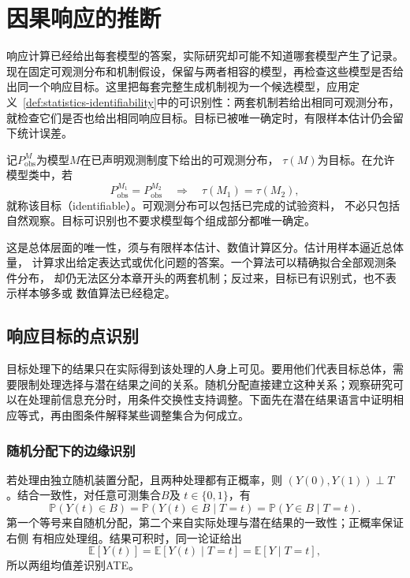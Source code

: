 \section{因果响应的推断}
\label{sec:causal-effect-identification}

响应计算已经给出每套模型的答案，实际研究却可能不知道哪套模型产生了记录。现在固定可观测分布和机制假设，保留与两者相容的模型，再检查这些模型是否给出同一个响应目标。这里把每套完整生成机制视为一个候选模型，应用定义~\ref{def:statistics-identifiability}中的可识别性：两套机制若给出相同可观测分布，就检查它们是否也给出相同响应目标。目标已被唯一确定时，有限样本估计仍会留下统计误差。

记\(P_{\mathrm{obs}}^M\)为模型\(M\)在已声明观测制度下给出的可观测分布，
\(\tau(M)\)为目标。在允许模型类中，若
\[
  P_{\mathrm{obs}}^{M_1}=P_{\mathrm{obs}}^{M_2}
  \quad\Longrightarrow\quad \tau(M_1)=\tau(M_2),
\]
就称该目标（identifiable）。可观测分布可以包括已完成的试验资料，
不必只包括自然观察。目标可识别也不要求模型每个组成部分都唯一确定。

这是总体层面的唯一性，须与有限样本估计、数值计算区分。估计用样本逼近总体量，
计算求出给定表达式或优化问题的答案。一个算法可以精确拟合全部观测条件分布，
却仍无法区分本章开头的两套机制；反过来，目标已有识别式，也不表示样本够多或
数值算法已经稳定。

\subsection{响应目标的点识别}
\label{sec:causal-point-identification}

目标处理下的结果只在实际得到该处理的人身上可见。要用他们代表目标总体，需要限制处理选择与潜在结果之间的关系。随机分配直接建立这种关系；观察研究可以在处理前信息充分时，用条件交换性支持调整。下面先在潜在结果语言中证明相应等式，再由图条件解释某些调整集合为何成立。

\subsubsection{随机分配下的边缘识别}
\label{sec:causal-randomized-identification}

若处理由独立随机装置分配，且两种处理都有正概率，则
\((Y(0),Y(1))\perp T\)。结合一致性，对任意可测集合\(B\)及
\(t\in\{0,1\}\)，有
\begin{equation}
  \mathbb P(Y(t)\in B)
  =
  \mathbb P(Y(t)\in B\mid T=t)
  =
  \mathbb P(Y\in B\mid T=t).
  \label{eq:causal-randomization-marginal-distribution}
\end{equation}
第一个等号来自随机分配，第二个来自实际处理与潜在结果的一致性；正概率保证右侧
有相应处理组。结果可积时，同一论证给出
\[
  \mathbb E[Y(t)]
  =\mathbb E[Y(t)\mid T=t]
  =\mathbb E[Y\mid T=t],
\]
所以两组均值差识别ATE。

